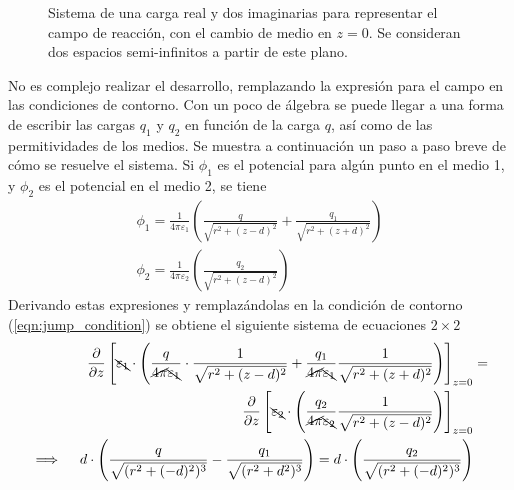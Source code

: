 \documentclass[12pt, twoside, onehalfspace, numbers, spanish]{ezthesis}
\numberwithin{equation}{section}
\begin{document}
\begin{figure}[h]
	\centering
	
	\caption{Sistema de una carga real y dos imaginarias para representar el campo de reacción, con el cambio de medio en $z=0$. Se consideran dos espacios semi-infinitos a partir de este plano.}\label{Fig:Fig_3}
\end{figure}
\noindent
No es complejo realizar el desarrollo, remplazando la expresión para el campo en las condiciones de contorno. Con un poco de álgebra se puede llegar a una forma de escribir las cargas $q_1$ y $q_2$ en función de la carga $q$, así como de las permitividades de los medios. Se muestra a continuación un paso a paso breve de cómo se resuelve el sistema. Si $\phi_1$ es el potencial para algún punto en el medio 1, y $\phi_2$ es el potencial en el medio 2, se tiene
\begin{gather}
\phi_1 = \frac{1}{4\pi\varepsilon_1}\left(\frac{q}{\sqrt{r^2+(z-d)^2}}+\frac{q_1}{\sqrt{r^2+(z+d)^2}}\right)\label{eqn:potential_system_image_method_1}\\
\phi_2 = \frac{1}{4\pi\varepsilon_2}\left(\frac{q_2}{\sqrt{r^2+(z-d)^2}}\right)\label{eqn:potential_system_image_method_2}
\end{gather}
Derivando estas expresiones y remplazándolas en la condición de contorno (\ref{eqn:jump_condition}) se obtiene el siguiente sistema de ecuaciones $2\times 2$\\
\begin{align*}
\frac{\partial}{\partial z}\left[\bcancel{\varepsilon_1}\cdot\left(\frac{q}{\cancel{4\pi}\bcancel{\varepsilon_1}}\cdot\frac{1}{\sqrt{r^2+(z-d)^2}}+\frac{q_1}{\cancel{4\pi}\bcancel{\varepsilon_1}}\frac{1}{\sqrt{r^2 + (z+d)^2}}\right)\right]_{z = 0} &=\\ \frac{\partial}{\partial z}\left[\bcancel{\varepsilon_2}\cdot\left(\frac{q_2}{\cancel{4\pi}\bcancel{\varepsilon_2}}\frac{1}{\sqrt{r^2 + (z-d)^2}}\right)\right]_{z=0}&\\
\implies\quad d\cdot\left(\frac{q}{\sqrt{(r^2 + (-d)^2)^3}} - \frac{q_1}{\sqrt{(r^2 + d^2)^3}}\right) = d\cdot\left(\frac{q_2}{\sqrt{(r^2 + (-d)^2)^3}}\right)
\end{align*}
\end{document}
